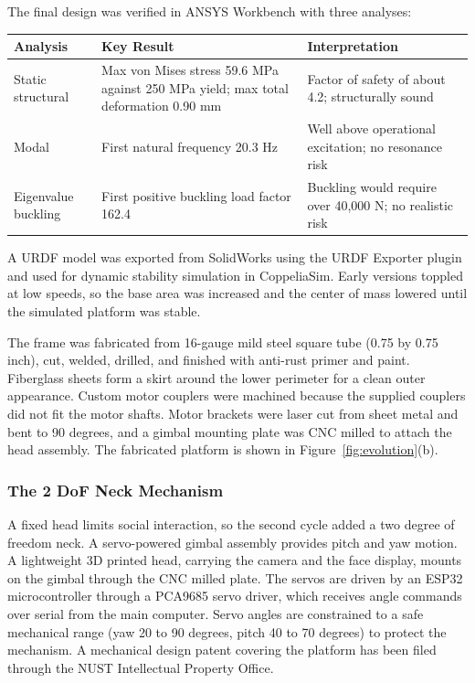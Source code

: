 \documentclass[11pt,a4paper]{article}
\begin{document}
The final design was verified in ANSYS Workbench with three analyses:

\begin{table}[H]
\centering
\begin{tabular}{@{}L{3.2cm}L{5.8cm}L{5.2cm}@{}}
\toprule
\textbf{Analysis} & \textbf{Key Result} & \textbf{Interpretation} \\
\midrule
Static structural & Max von Mises stress 59.6 MPa against 250 MPa yield; max total deformation 0.90 mm & Factor of safety of about 4.2; structurally sound \\
Modal & First natural frequency 20.3 Hz & Well above operational excitation; no resonance risk \\
Eigenvalue buckling & First positive buckling load factor 162.4 & Buckling would require over 40,000 N; no realistic risk \\
\bottomrule
\end{tabular}
\end{table}

A URDF model was exported from SolidWorks using the URDF Exporter plugin and used for dynamic stability simulation in CoppeliaSim. Early versions toppled at low speeds, so the base area was increased and the center of mass lowered until the simulated platform was stable.

The frame was fabricated from 16-gauge mild steel square tube (0.75 by 0.75 inch), cut, welded, drilled, and finished with anti-rust primer and paint. Fiberglass sheets form a skirt around the lower perimeter for a clean outer appearance. Custom motor couplers were machined because the supplied couplers did not fit the motor shafts. Motor brackets were laser cut from sheet metal and bent to 90 degrees, and a gimbal mounting plate was CNC milled to attach the head assembly. The fabricated platform is shown in Figure~\ref{fig:evolution}(b).

\subsubsection{The 2 DoF Neck Mechanism}

A fixed head limits social interaction, so the second cycle added a two degree of freedom neck. A servo-powered gimbal assembly provides pitch and yaw motion. A lightweight 3D printed head, carrying the camera and the face display, mounts on the gimbal through the CNC milled plate. The servos are driven by an ESP32 microcontroller through a PCA9685 servo driver, which receives angle commands over serial from the main computer. Servo angles are constrained to a safe mechanical range (yaw 20 to 90 degrees, pitch 40 to 70 degrees) to protect the mechanism. A mechanical design patent covering the platform has been filed through the NUST Intellectual Property Office.
\end{document}
